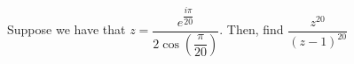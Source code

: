 Suppose we have that $z = \dfrac{e^{\dfrac{i\pi}{20}}}{2 \cos ( \dfrac{\pi}{20})}$. Then, find $\dfrac{z^{20}}{(z - 1)^{20}}$

